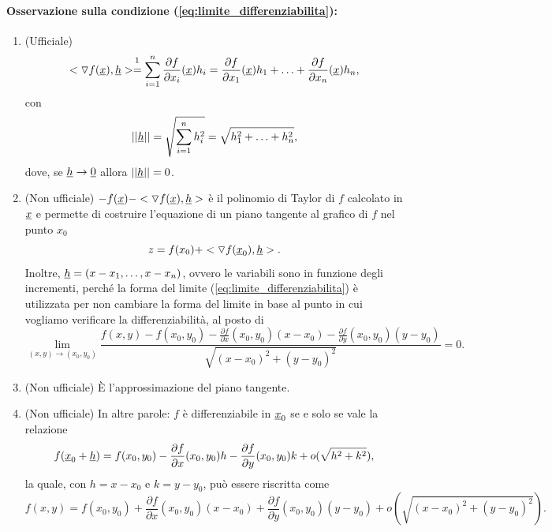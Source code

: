 \paragraph{Osservazione sulla condizione (\ref{eq:limite_differenziabilita}):}
\begin{enumerate}
	\item (Ufficiale)
	\begin{equation*}
		<\triangledown f(\uline x), \uline h> \overset{\footnotemark}{=} \sum_{i=1}^{n} \frac{\partial f}{\partial x_i}(\uline x)h_i = \frac{\partial f}{\partial x_1}(\uline x)h_1 + \hdots + \frac{\partial f}{\partial x_n}(\uline x)h_n,
	\end{equation*}
	con 
	\begin{equation*}
		||\uline h||=\sqrt{\sum_{i=1}^{n}h^2_i} = \sqrt{h^2_1 + \hdots + h^2_n},
	\end{equation*}
	dove, se $\uline h\rightarrow \uline 0$ allora $||\uline h||=0$.
	\item (Non ufficiale) $- f(\uline x) - <\triangledown f(\uline x), \uline h>$ è il polinomio di Taylor di $f$ calcolato in $\uline x$ e permette di costruire l'equazione di un piano tangente al grafico di $f$ nel punto $x_0$
	 \begin{equation*}
	 	z= f(x_0) + <\triangledown f(\uline x_0), \uline h>.
	 \end{equation*}
	 Inoltre, $\uline h=(x-x_1,\hdots, x-x_n)$, ovvero le variabili sono in funzione degli incrementi, perché la forma del limite (\ref{eq:limite_differenziabilita}) è utilizzata per non cambiare la forma del limite in base al punto in cui vogliamo verificare la differenziabilità, al posto di
	\begin{equation*}
		\lim\limits_{(x,y)\rightarrow(x_0,y_0)} \frac{f(x,y)-f(x_0,y_0)- \frac{\partial f}{\partial x}(x_0,y_0)(x-x_0) - \frac{\partial f}{\partial y}(x_0,y_0)(y-y_0)}{\sqrt{(x-x_0)^2 + (y - y_0)^2}}=0.
	\end{equation*}
	\item (Non ufficiale) È l'approssimazione del piano tangente.
	\item (Non ufficiale) In altre parole: $f$ è differenziabile in $\uline x_0$ se e solo se vale la relazione
	\begin{equation*}
		f(\uline x_0 + \uline h) = f(x_0,y_0)- \frac{\partial f}{\partial x}(x_0,y_0)h - \frac{\partial f}{\partial y}(x_0,y_0)k + o(\sqrt{h^2 + k^2}),
		\end{equation*}
		la quale, con $h = x-x_0$ e $k=y-y_0$, può essere riscritta come
		\begin{equation*}
			f(x,y)= f(x_0,y_0) + \frac{\partial f}{\partial x}(x_0,y_0)(x-x_0) + \frac{\partial f}{\partial y}(x_0,y_0)(y-y_0) + o(\sqrt{(x-x_0)^2 + (y - y_0)^2}).
		\end{equation*}
\end{enumerate}

